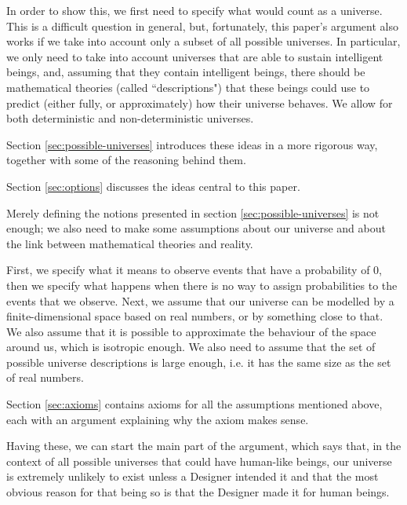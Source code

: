 \documentclass[a4paper
,draft
]{article}
\newcommand{\ghilimele}[1]{``#1"}
\begin{document}
In order to show this, we first need to specify what would count as a universe.
This is a difficult question in general, but, fortunately, this paper's argument
also works if we take into account only a subset of all possible universes.
In particular, we only need to take into account universes that are able
to sustain intelligent beings,
and, assuming that they contain intelligent beings, there should be mathematical
theories (called \ghilimele{descriptions}) that these beings could use to
predict (either fully, or approximately) how their universe behaves.
We allow for both deterministic and non-deterministic universes.

Section \ref{sec:possible-universes} introduces these ideas in a more
rigorous way, together with some of the reasoning behind them.

Section \ref{sec:options} discusses the ideas central to this paper.

Merely defining the notions presented in section \ref{sec:possible-universes}
is not enough;
we also need to make some assumptions about our universe and about
the link between mathematical theories and reality.

First, we specify what it means to observe events that have a probability of $0$,
then we specify what happens when there is no way to assign probabilities to
the events that we observe.
Next, we assume that our universe can be modelled by a finite-dimensional
space based on real numbers, or by something close to that.
We also assume that it is possible to approximate the behaviour of the space
around us, which is isotropic enough.
We also need to assume that the set of possible universe descriptions
is large enough, i.e. it has the same size as the set of real numbers.

Section \ref{sec:axioms} contains axioms for all the assumptions mentioned
above, each with an argument explaining why the axiom makes sense.

Having these, we can start the main part of the argument,
which says that, in the context of all possible universes that could
have human-like beings, our universe is extremely unlikely to exist
unless a Designer
intended it and that the most obvious reason for that being so is
that the Designer made it for human beings.
\end{document}
